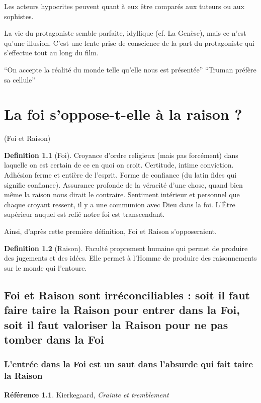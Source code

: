 \documentclass[french]{book}
\theoremstyle{definition}
\newtheorem*{dfn}{Definition}
\newtheorem*{refe}{Référence}
\begin{document}
Les acteurs hypocrites peuvent quant à eux être comparés aux tuteurs ou aux sophistes.

La vie du protagoniste semble parfaite, idyllique (cf. La Genèse), mais ce n’est qu’une illusion. C’est une lente prise de conscience de la part du protagoniste qui s’effectue tout au long du film.

“On accepte la réalité du monde telle qu’elle nous est présentée”
“Truman préfère sa cellule”

\chapter{La foi s’oppose-t-elle à la raison ?}
(Foi et Raison)
\begin{dfn}[Foi]
Croyance d’ordre religieux (mais pas forcément) dans laquelle on est certain de ce en quoi on croit. Certitude, intime conviction. Adhésion ferme et entière de l’esprit. Forme de confiance (du latin fides qui signifie confiance). Assurance profonde de la véracité d’une chose, quand bien même la raison nous dirait le contraire. Sentiment intérieur et personnel que chaque croyant ressent, il y a une communion avec Dieu dans la foi. L'Être supérieur auquel est relié notre foi est transcendant.
\end{dfn}

Ainsi, d’après cette première définition, Foi et Raison s’opposeraient.

\begin{dfn}[Raison]
Faculté proprement humaine qui permet de produire des jugements et des idées. Elle permet à l'Homme de produire des raisonnements sur le monde qui  l’entoure.
\end{dfn}



\section{Foi et Raison sont irréconciliables : soit il faut faire taire la Raison pour entrer dans la Foi, soit il faut valoriser la Raison pour ne pas tomber dans la Foi}

\subsection{L'entrée dans la Foi est un saut dans l’absurde qui fait taire la Raison}

\begin{refe}
	Kierkegaard, \textit{Crainte et tremblement}
\end{refe}
\end{document}
